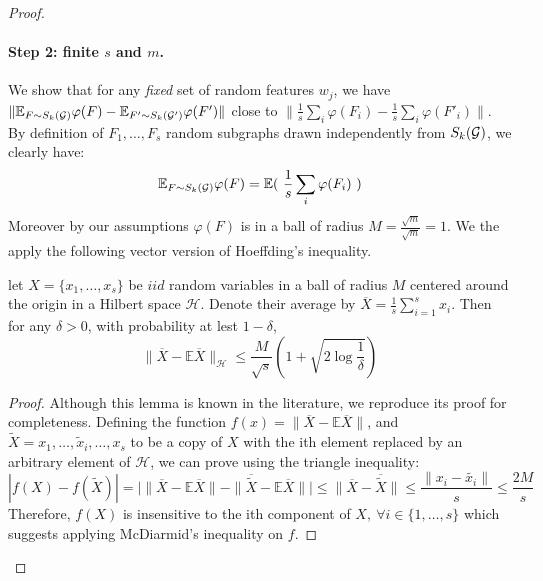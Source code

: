 \begin{proof}
\paragraph{Step 2: finite ${s}$ and $m$.} We show that for any \emph{fixed} set of random features $w_j$, we have $\| \mathbb{E}_{F \sim S_k(\mathcal{G})} \varphi(F) - \mathbb{E}_{F' \sim S_k(\mathcal{G}')} \varphi(F')\|$ close to $\| \frac{1}{{s}} \sum_i \varphi(F_i) - \frac{1}{{s}} \sum_i \varphi(F'_i)\|$. 
By definition of $F_1,\ldots, F_{s}$ random subgraphs drawn independently from $S_k(\mathcal{G})$, we clearly have: 
\begin{equation}
\label{eq:subsample}
    \mathbb{E}_{F \sim S_k(\mathcal{G})} \varphi(F)= \mathbb{E} (~\frac{1}{{s}} \sum_i \varphi(F_i)~)
\end{equation} 
Moreover by our assumptions $\varphi(F)$ is in a ball of radius $M=\frac{\sqrt{m}}{\sqrt{m}}=1$. We the apply the following vector version of Hoeffding's inequality.
\begin{lemma}
\label{lemma:vector_hoeffding}
let $X=\{x_1,\ldots,x_{s}\}$ be $iid$ random variables in a ball of radius $M$ centered around the origin in a Hilbert space $\mathcal{H}$. Denote their average by $\overline{X}=\frac{1}{{s}}\sum_{i=1}^{s}x_i$. Then for any $\delta>0$, with probability at lest $1-\delta$, 
\begin{equation}
\label{eq:vector_hoeffding0}
  \| \overline{X}-\mathbb{E}\overline{X}\|_\mathcal{H} \leq \frac{M}{\sqrt{{s}}}\left(1+\sqrt{2\log\frac{1}{\delta}}\right)
\end{equation}
\end{lemma}
\begin{proof}
Although this lemma is known in the literature, we reproduce its proof for completeness. Defining the function $f(x)= \| \overline{X}-\mathbb{E}\overline{X}\|$, and $\widetilde{X}={x_1,\ldots,\widetilde{x}_i,\ldots,x_{s}}$ to be a copy of $X$ with the ith element replaced by an arbitrary element of $\mathcal{H}$, we can prove using the triangle inequality:
\begin{equation}
    |f(X)-f(\widetilde{X})|=\Big|\| \overline{X}-\mathbb{E}\overline{X} \|-\|\overline{\widetilde{X}} - \mathbb{E}\overline{X}  \| \Big|\leq \| \overline{X} - \overline{\widetilde{X}}\|\leq
    \frac{\|x_i - \widetilde{x_i} \|}{{s}}\leq
    \frac{2M}{{s}}
\end{equation}
Therefore, $f(X)$ is insensitive to the ith component of $X,~ \forall i \in \{1,\ldots,{s}\}$ which suggests applying McDiarmid's inequality on $f$.


\end{proof}
\end{proof}
